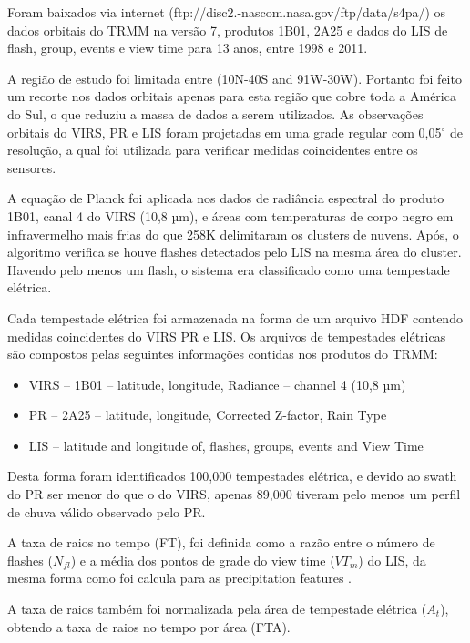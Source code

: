 \documentclass[preprint,authoryear,3p]{elsarticle}
\begin{document}
\begin{multicols}{2}
Foram baixados via internet (ftp://disc2.-nascom.nasa.gov/ftp/data/s4pa/) os dados orbitais do TRMM na versão 7, produtos 1B01, 2A25 e dados do LIS de flash, group, events e view time para 13 anos, entre 1998 e 2011. 

A região de estudo foi limitada entre (10N-40S and 91W-30W). Portanto foi feito um recorte nos dados orbitais apenas para esta região que cobre toda a América do Sul, o que reduziu a massa de dados a serem utilizados. 
As observações orbitais do VIRS, PR e LIS foram projetadas em uma grade regular com 0,05$^{\circ}$ de resolução, a qual foi utilizada para verificar medidas coincidentes entre os sensores.

A equação de Planck foi aplicada nos dados de radiância espectral do produto 1B01, canal 4 do VIRS (10,8 µm), e áreas com temperaturas de corpo negro em infravermelho mais frias do que 258K delimitaram os clusters de nuvens. Após, o algoritmo verifica se houve flashes detectados pelo LIS na mesma área do cluster. Havendo pelo menos um flash, o sistema era classificado como uma tempestade elétrica. 

Cada tempestade elétrica foi armazenada na forma de um arquivo HDF contendo medidas coincidentes do VIRS PR e LIS. Os arquivos de tempestades elétricas são compostos pelas seguintes informações contidas nos produtos do TRMM:

\begin{itemize}
\item VIRS -- 1B01 -- latitude, longitude, Radiance -- channel 4 (10,8 µm)
\item PR -- 2A25 -- latitude, longitude, Corrected Z-factor, Rain Type 
\item LIS -- latitude and longitude of, flashes, groups, events and View Time  
\end{itemize} 

Desta forma foram identificados 100,000 tempestades elétrica, e devido ao swath do PR ser menor do que o do VIRS, apenas 89,000 tiveram pelo menos um perfil de chuva válido observado pelo PR.

A taxa de raios no tempo (FT), foi definida como a razão entre o número de flashes ($N_{fl}$) e a média dos pontos de grade do view time ($VT_m$) do LIS, da mesma forma como foi calcula para as precipitation features \citep{cecil2005, Nesbitt2000}. 


A taxa de raios também foi normalizada pela área de tempestade elétrica ($A_t$), obtendo a taxa de raios no tempo por área (FTA). 


\end{multicols}
\end{document}
